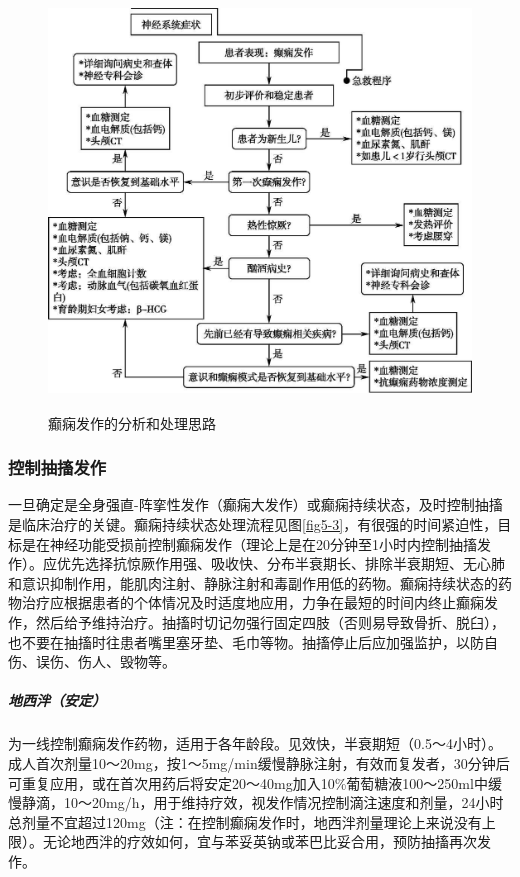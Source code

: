 \begin{figure}[!htbp]
 \centering
 \includegraphics[width=4.77083in,height=4.34375in]{./images/Image00035.jpg}
 \captionsetup{justification=centering}
 \caption{癫痫发作的分析和处理思路}
 \label{fig5-2}
  \end{figure} 

\subsubsection{控制抽搐发作}

一旦确定是全身强直-阵挛性发作（癫痫大发作）或癫痫持续状态，及时控制抽搐是临床治疗的关键。癫痫持续状态处理流程见图\ref{fig5-3}，有很强的时间紧迫性，目标是在神经功能受损前控制癫痫发作（理论上是在20分钟至1小时内控制抽搐发作）。应优先选择抗惊厥作用强、吸收快、分布半衰期长、排除半衰期短、无心肺和意识抑制作用，能肌肉注射、静脉注射和毒副作用低的药物。癫痫持续状态的药物治疗应根据患者的个体情况及时适度地应用，力争在最短的时间内终止癫痫发作，然后给予维持治疗。抽搐时切记勿强行固定四肢（否则易导致骨折、脱臼），也不要在抽搐时往患者嘴里塞牙垫、毛巾等物。抽搐停止后应加强监护，以防自伤、误伤、伤人、毁物等。

\subparagraph{地西泮（安定）}

为一线控制癫痫发作药物，适用于各年龄段。见效快，半衰期短（0.5～4小时）。成人首次剂量10～20mg，按1～5mg/min缓慢静脉注射，有效而复发者，30分钟后可重复应用，或在首次用药后将安定20～40mg加入10\%葡萄糖液100～250ml中缓慢静滴，10～20mg/h，用于维持疗效，视发作情况控制滴注速度和剂量，24小时总剂量不宜超过120mg（注：在控制癫痫发作时，地西泮剂量理论上来说没有上限）。无论地西泮的疗效如何，宜与苯妥英钠或苯巴比妥合用，预防抽搐再次发作。


